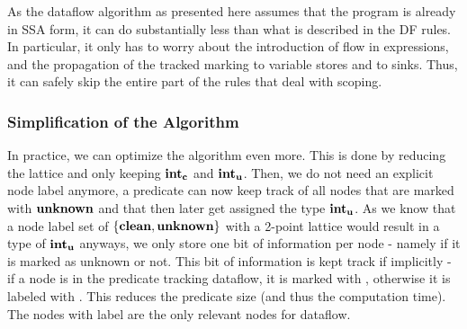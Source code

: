 As the dataflow algorithm as presented here assumes that the program is already in 
SSA form, it can do substantially less than what is described in the DF rules.
In particular, it only has to worry about the introduction of flow in expressions,
and the propagation of the tracked marking to variable stores and to sinks.
Thus, it can safely skip the entire part of the rules that deal with scoping.


\subsubsection*{Simplification of the Algorithm}
In practice, we can optimize the algorithm even more.
This is done by reducing the lattice and only keeping $\textbf{int}_\textbf{c}$ and $\textbf{int}_\textbf{u}$.
Then, we do not need an explicit node label anymore, a predicate can now
keep track of all nodes that are marked with $\textbf{unknown}$ and that then later 
get assigned the type $\textbf{int}_\textbf{u}$.
As we know that a node label set of $\{\textbf{clean}, \textbf{unknown}\}$ with a 2-point lattice
would result in a type of $\textbf{int}_\textbf{u}$ anyways, we only store one bit of information
per node - namely if it is marked as unknown or not.
This bit of information is kept track if implicitly - if a node is in the predicate 
tracking dataflow, it is marked with \labunknown{}, otherwise it is labeled with \labclean{}.
This reduces the predicate size (and thus the computation time).
The nodes with label \labunknown{} are the only relevant nodes for dataflow.

